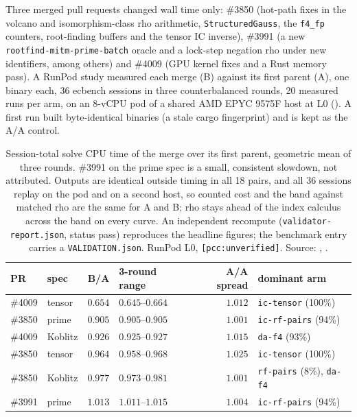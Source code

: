 Three merged pull requests changed wall time only: \#3850 (hot-path fixes in
the volcano and isomorphism-class rho arithmetic, \texttt{StructuredGauss},
the \texttt{f4\_fp} counters, root-finding buffers and the tensor IC
inverse), \#3991 (a new \texttt{rootfind-mitm-prime-batch} oracle and a
lock-step negation rho under new identifiers, among others) and \#4009 (GPU
kernel fixes and a Rust memory pass). A RunPod study measured each merge
(B) against its first parent (A), one binary each, 36 ecbench sessions in
three counterbalanced rounds, 20 measured runs per arm, on an 8-vCPU pod
of a shared AMD EPYC 9575F host at L0
(). A first run built
byte-identical binaries (a stale cargo fingerprint) and is kept as the A/A
control.

\begin{table}[t]
\centering\small
\begin{tabular}{@{}llrlrl@{}}
\toprule
PR & spec & B/A & 3-round range & A/A spread & dominant arm \\
\midrule
\#4009 & tensor & $\mathbf{0.654}$ & $0.645$--$0.664$ & $1.012$ & \texttt{ic-tensor} (100\%) \\
\#3850 & prime & $\mathbf{0.905}$ & $0.905$--$0.905$ & $1.001$ & \texttt{ic-rf-pairs} (94\%) \\
\#4009 & Koblitz & $\mathbf{0.926}$ & $0.925$--$0.927$ & $1.015$ & \texttt{da-f4} (93\%) \\
\#3850 & tensor & $0.964$ & $0.958$--$0.968$ & $1.025$ & \texttt{ic-tensor} (100\%) \\
\#3850 & Koblitz & $0.977$ & $0.973$--$0.981$ & $1.001$ & \texttt{rf-pairs} (8\%), \texttt{da-f4} \\
\#3991 & prime & $\mathbf{1.013}$ & $1.011$--$1.015$ & $1.004$ & \texttt{ic-rf-pairs} (94\%) \\
\bottomrule
\end{tabular}
\caption[]{Session-total solve CPU time of the merge over its first parent,
geometric mean of three rounds. \#3991 on the prime spec is a small,
consistent slowdown, not attributed. Outputs are identical outside timing
in all 18 pairs, and all 36 sessions replay on the pod and on a second
host, so counted cost and the band against matched rho are the same for A
and B; rho stays ahead of the index calculus across the band on every
curve. An independent recompute (\texttt{validator-report.json}, status
pass) reproduces the headline figures; the benchmark entry carries a
\texttt{VALIDATION.json}. RunPod L0, \texttt{[pcc:unverified]}. Source:
,
.}
\label{tab:in-wallfix}
\end{table}

